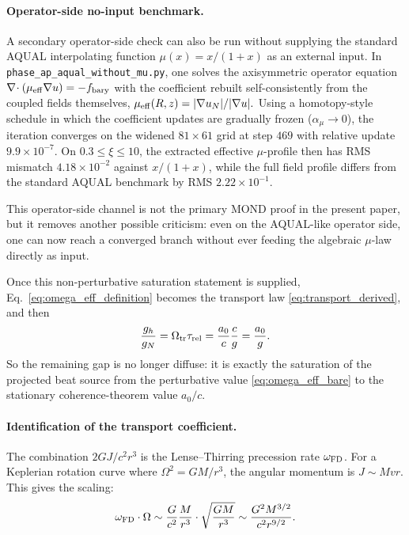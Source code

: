 \documentclass[11pt]{article}
\begin{document}
\paragraph{Operator-side no-input benchmark.}
A secondary operator-side check can also be run without supplying the
standard AQUAL interpolating function $\mu(x)=x/(1+x)$ as an external
input.  In \texttt{phase\_ap\_aqual\_without\_mu.py}, one solves the
axisymmetric operator equation
\(
\nabla\!\cdot(\mu_{\rm eff}\nabla u)=-f_{\rm bary}
\)
with the coefficient rebuilt self-consistently from the coupled fields
themselves,
\(
\mu_{\rm eff}(R,z)=|\nabla u_N|/|\nabla u|.
\)
Using a homotopy-style schedule in which the coefficient updates are
gradually frozen (\(\alpha_\mu\to0\)), the iteration converges on the
widened \(81\times61\) grid at step \(469\) with relative update
\(9.9\times10^{-7}\).  On \(0.3\le\xi\le10\), the extracted effective
\(\mu\)-profile then has RMS mismatch \(4.18\times10^{-2}\) against
\(x/(1+x)\), while the full field profile differs from the standard AQUAL
benchmark by RMS \(2.22\times10^{-1}\).

This operator-side channel is not the primary MOND proof in the present
paper, but it removes another possible criticism: even on the AQUAL-like
operator side, one can now reach a converged branch without ever feeding
the algebraic \(\mu\)-law directly as input.

Once this non-perturbative saturation statement is supplied, Eq.~\eqref{eq:omega_eff_definition}
becomes the transport law \eqref{eq:transport_derived}, and then
\[
\frac{g_h}{g_N}=\Omega_{\rm tr}\tau_{\rm rel}
=\frac{a_0}{c}\frac{c}{g}
=\frac{a_0}{g}.
\]
So the remaining gap is no longer diffuse: it is exactly the saturation
of the projected beat source from the perturbative value
\eqref{eq:omega_eff_bare} to the stationary coherence-theorem value
$a_0/c$.

\paragraph{Identification of the transport coefficient.}
The combination $2GJ/c^2r^3$ is the Lense--Thirring precession rate $\omega_{\rm FD}$. For a Keplerian rotation curve where $\Omega^2 = GM/r^3$, the angular momentum is $J \sim Mvr$. This gives the scaling:
\begin{equation}
\omega_{\rm FD} \cdot \Omega \sim \frac{G}{c^2}\frac{M}{r^3} \cdot \sqrt{\frac{GM}{r^3}} \sim \frac{G^2M^{3/2}}{c^2r^{9/2}}.
\label{eq:scaling}
\end{equation}
\end{document}
